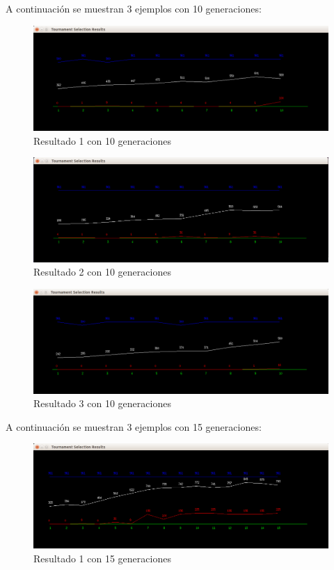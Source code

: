\documentclass[11pt,letterpaper]{article}
\begin{document}
A continuación se muestran 3 ejemplos con 10 generaciones:
\begin{figure}[H]
	\centering
	\includegraphics[scale = 0.4]{images/10gen1}
	\caption{Resultado 1 con 10 generaciones}
\end{figure}

\begin{figure}[H]
	\centering
	\includegraphics[scale = 0.4]{images/10gen2}
	\caption{Resultado 2 con 10 generaciones}
\end{figure}

\begin{figure}[H]
	\centering
	\includegraphics[scale = 0.4]{images/10gen3}
	\caption{Resultado 3 con 10 generaciones}
\end{figure}

A continuación se muestran 3 ejemplos con 15 generaciones:
\begin{figure}[H]
	\centering
	\includegraphics[scale = 0.4]{images/15gen1}
	\caption{Resultado 1 con 15 generaciones}
\end{figure}
\end{document}
